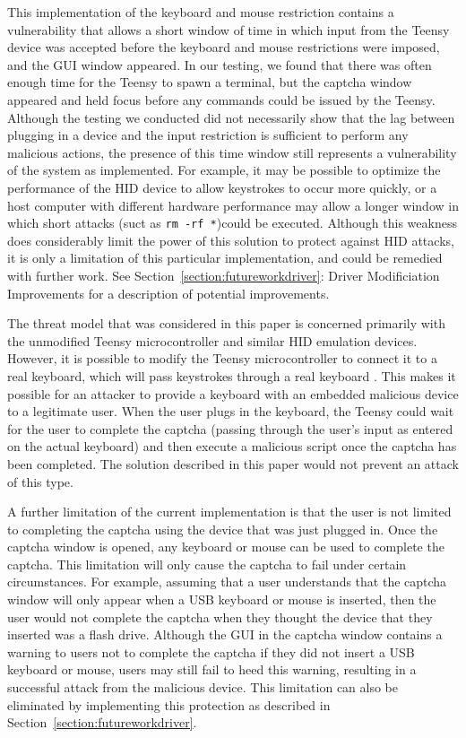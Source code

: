 \documentclass[pagenumbers]{ieee}
\begin{document}
This implementation of the keyboard and mouse restriction contains a vulnerability that allows a short window of time in which input from the Teensy device was accepted before the keyboard and mouse restrictions were imposed, and the GUI window appeared. In our testing, we found that there was often enough time for the Teensy to spawn a terminal, but the captcha window appeared and held focus before any commands could be issued by the Teensy. Although the testing we conducted did not necessarily show that the lag between plugging in a device and the input restriction is sufficient to perform any malicious actions, the presence of this time window still represents a vulnerability of the system as implemented.  For example, it may be possible to optimize the performance of the HID device to allow keystrokes to occur more quickly, or a host computer with different hardware performance may allow a longer window in which short attacks (suct as \texttt{rm -rf *})could be executed.  Although this weakness does considerably limit the power of this solution to protect against HID attacks, it is only a limitation of this particular implementation, and could be remedied with further work. See Section~\ref{section:futureworkdriver}: Driver Modificiation Improvements for a description of potential improvements.

The threat model that was considered in this paper is concerned primarily with the unmodified Teensy microcontroller and similar HID emulation devices. However, it is possible to modify the Teensy microcontroller to connect it to a real keyboard, which will pass keystrokes through a real keyboard \cite{pjrc}. This makes it possible for an attacker to provide a keyboard with an embedded malicious device to a legitimate user. When the user plugs in the keyboard, the Teensy could wait for the user to complete the captcha (passing through the user's input as entered on the actual keyboard) and then execute a malicious script once the captcha has been completed. The solution described in this paper would not prevent an attack of this type.

A further limitation of the current implementation is that the user is not limited to completing the captcha using the device that was just plugged in.  Once the captcha window is opened, any keyboard or mouse can be used to complete the captcha. This limitation will only cause the captcha to fail under certain circumstances. For example, assuming that a user understands that the captcha window will only appear when a USB keyboard or mouse is inserted, then the user would not complete the captcha when they thought the device that they inserted was a flash drive. Although the GUI in the captcha window contains a warning to users not to complete the captcha if they did not insert a USB keyboard or mouse, users may still fail to heed this warning, resulting in a successful attack from the malicious device. This limitation can also be eliminated by implementing this protection as described in Section~\ref{section:futureworkdriver}.
\end{document}

